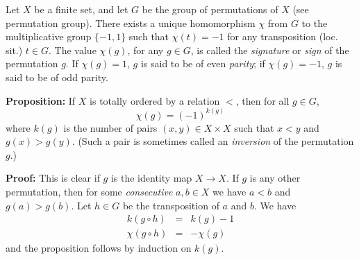 \documentclass[12pt]{article}
\begin{document}
Let $X$ be a finite set, and let $G$ be the group of permutations of $X$ (see
permutation group). There exists a unique homomorphism $\chi$ from $G$ to the
multiplicative group $\{-1,1\}$ such that $\chi(t)=-1$ for any transposition
(loc. sit.) $t\in G$. The value $\chi(g)$, for any $g\in G$, is called the
\emph{signature} or \emph{sign} of the permutation $g$. If
$\chi(g)=1$, $g$ is said to be of even \emph{parity}; if
$\chi(g)=-1$, $g$ is said to be of odd parity.

\textbf{Proposition:} If $X$ is totally ordered by 
a relation $<$, then for all $g\in G$,
\begin{equation}
\chi(g)=(-1)^{k(g)}
\end{equation}
where $k(g)$ is the number of pairs $(x,y)\in X\times X$ such that
$x<y$ and $g(x)>g(y)$. (Such a pair is sometimes called an \emph{inversion}
of the permutation $g$.)

\textbf{Proof:} This is clear if $g$ is the identity map $X\to X$.
If $g$ is any other permutation, then for some
\emph{consecutive} $a,b\in X$ we have $a<b$ and $g(a)>g(b)$. Let $h\in G$
be the transposition of $a$ and $b$. We have
\begin{eqnarray*}
k(g \circ h)&=&k(g)-1 \\
\chi(g \circ h)&=&-\chi(g)
\end{eqnarray*}
and the proposition follows by induction on $k(g)$.
\end{document}
